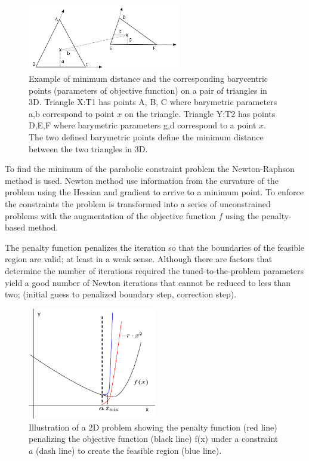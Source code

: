 \documentclass[times,12pt]{article}
\begin{document}
\begin{figure}[!h]
\centering
\includegraphics[width=0.6\textwidth]{c} \protect\caption{\label{fig1}Example of minimum distance and the corresponding barycentric points (parameters of objective function) on a pair of triangles in 3D. Triangle X:T1 has points A, B, C where barymetric parameters a,b correspond to point $x$ on the triangle. Triangle Y:T2 has points D,E,F where barymetric parameters g,d correspond to a point $x$. The two defined barymetric points define the minimum distance between the two triangles in 3D.}
\end{figure} 

To find the minimum of the parabolic constraint problem the Newton-Raphson method is used. Newton method use information from the curvature of the problem using the Hessian and gradient to arrive to a minimum point. To enforce the constraints the problem is transformed into a series of unconstrained problems with the augmentation of the objective function $f$ using the penalty-based method.

The penalty function penalizes the iteration so that the boundaries of the feasible region are valid; at least in a weak sense. Although there are factors that determine the number of iterations required the tuned-to-the-problem parameters yield a good number of Newton iterations that cannot be reduced to less than two; (initial guess to penalized boundary step, correction step).

\begin{figure}[!h]
\centering
\includegraphics[width=0.5\textwidth]{penalty} \protect\caption{\label{fig2}Illustration of a 2D problem showing the penalty function (red line) penalizing the objective function (black line) f(x) under a constraint $a$ (dash line) to create the feasible region (blue line).}
\end{figure} 
\end{document}
